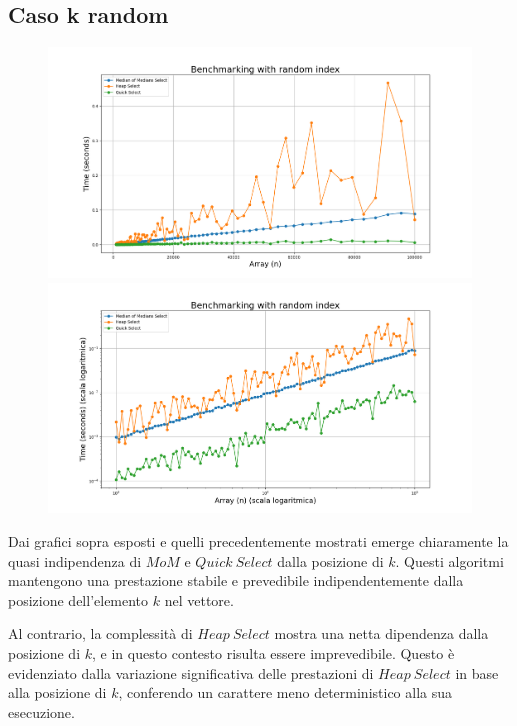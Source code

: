 \documentclass[a4paper]{article}
\begin{document}
\subsection{Caso k random}
\begin{figure}[h]
            \centering
            \includegraphics[width=.83\textwidth]{graphs/k_random_n.png}
            \includegraphics[width=.83\textwidth]{graphs/k_random_2xlog.png}
\end{figure}
Dai grafici sopra esposti e quelli precedentemente mostrati emerge chiaramente la quasi indipendenza di $MoM$ e $Quick\ Select$ dalla posizione di $k$. Questi algoritmi mantengono una prestazione stabile e prevedibile indipendentemente dalla posizione dell'elemento $k$ nel vettore.

Al contrario, la complessità di $Heap\ Select$ mostra una netta dipendenza dalla posizione di $k$, e in questo contesto risulta essere imprevedibile. Questo è evidenziato dalla variazione significativa delle prestazioni di $Heap\ Select$ in base alla posizione di $k$, conferendo un carattere meno deterministico alla sua esecuzione.
\newpage
\end{document}
